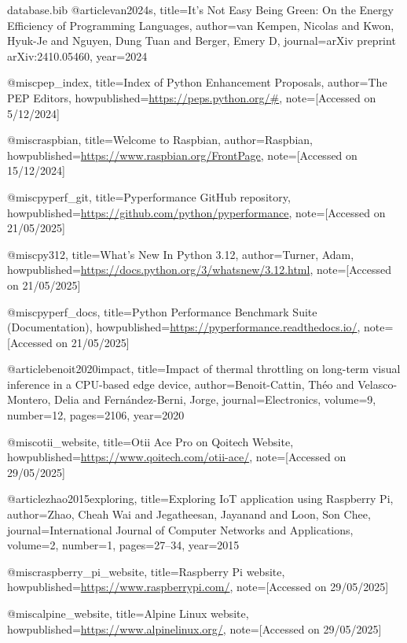 \begin{filecontents*}{database.bib}
@article{van2024s,
  title={It's Not Easy Being Green: On the Energy Efficiency of Programming Languages},
  author={van Kempen, Nicolas and Kwon, Hyuk-Je and Nguyen, Dung Tuan and Berger, Emery D},
  journal={arXiv preprint arXiv:2410.05460},
  year={2024}
}

@misc{pep_index,
  title={Index of Python Enhancement Proposals},
  author={{The PEP Editors}},
  howpublished={\url{https://peps.python.org/#}},
  note={[Accessed on 5/12/2024]}
}

@misc{raspbian,
  title={Welcome to Raspbian},
  author={Raspbian},
  howpublished={\url{https://www.raspbian.org/FrontPage}},
  note={[Accessed on 15/12/2024]}
}

@misc{pyperf_git,
  title={Pyperformance GitHub repository},
  howpublished={\url{https://github.com/python/pyperformance}},
  note={[Accessed on 21/05/2025]}
}

@misc{py312,
  title={What's New In Python 3.12},
  author={Turner, Adam},
  howpublished={\url{https://docs.python.org/3/whatsnew/3.12.html}},
  note={[Accessed on 21/05/2025]}
}

@misc{pyperf_docs,
  title={Python Performance Benchmark Suite (Documentation)},
  howpublished={\url{https://pyperformance.readthedocs.io/}},
  note={[Accessed on 21/05/2025]}
}

@article{benoit2020impact,
  title={Impact of thermal throttling on long-term visual inference in a CPU-based edge device},
  author={Benoit-Cattin, Th{\'e}o and Velasco-Montero, Delia and Fern{\'a}ndez-Berni, Jorge},
  journal={Electronics},
  volume={9},
  number={12},
  pages={2106},
  year={2020}
}

@misc{otii_website,
  title={Otii Ace Pro on Qoitech Website},
  howpublished={\url{https://www.qoitech.com/otii-ace/}},
  note={[Accessed on 29/05/2025]}
}

@article{zhao2015exploring,
  title={Exploring IoT application using Raspberry Pi},
  author={Zhao, Cheah Wai and Jegatheesan, Jayanand and Loon, Son Chee},
  journal={International Journal of Computer Networks and Applications},
  volume={2},
  number={1},
  pages={27--34},
  year={2015}
}

@misc{raspberry_pi_website,
  title={Raspberry Pi website},
  howpublished={\url{https://www.raspberrypi.com/}},
  note={[Accessed on 29/05/2025]}
}

@misc{alpine_website,
  title={Alpine Linux website},
  howpublished={\url{https://www.alpinelinux.org/}},
  note={[Accessed on 29/05/2025]}
}


\end{filecontents*}
